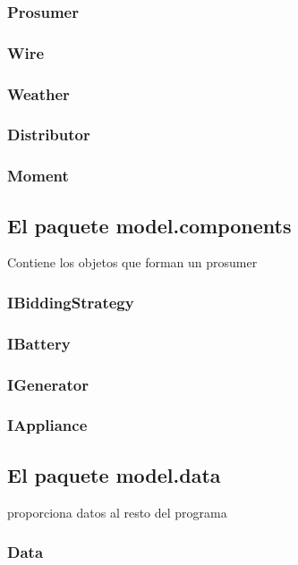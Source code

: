\documentclass[12pt,a4paper,openright,oneside]{article}
\numberwithin{equation}{section}
\theoremstyle{definition}
\begin{document}
\subsubsection{Prosumer}

\subsubsection{Wire}

\subsubsection{Weather}

\subsubsection{Distributor}

\subsubsection{Moment}

\subsection{El paquete model.components} 
Contiene los objetos que forman un prosumer
\subsubsection{IBiddingStrategy}

\subsubsection{IBattery}

\subsubsection{IGenerator}

\subsubsection{IAppliance}

\subsection{El paquete model.data}
proporciona datos al resto del programa
\subsubsection{Data}
\end{document}
